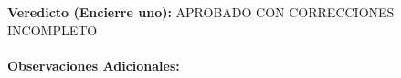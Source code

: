 \documentclass[11pt, a4paper]{article}
\begin{document}
\vspace{1cm}
\begin{tcolorbox}[colback=white, colframe=black, title=\textbf{Resolución Final del Taller}]
\textbf{Veredicto (Encierre uno):} \hspace{1cm} APROBADO \hspace{1cm} CON CORRECCIONES \hspace{1cm} INCOMPLETO \\
\\
\textbf{Observaciones Adicionales:} \vspace{1.5cm}
\end{tcolorbox}
\end{document}
